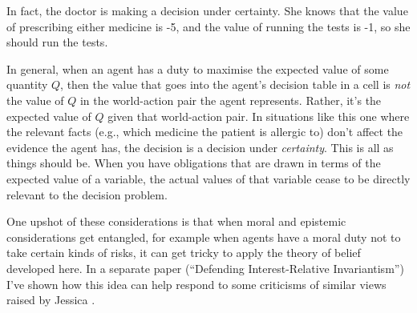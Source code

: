\noindent In fact, the doctor is making a decision under certainty. She knows that the value of prescribing either medicine is -5, and the value of running the tests is -1, so she should run the tests.

In general, when an agent has a duty to maximise the expected value of some quantity \(Q\), then the value that goes into the agent's decision table in a cell is \textit{not} the value of \(Q\) in the world-action pair the agent represents. Rather, it's the expected value of \(Q\) given that world-action pair. In situations like this one where the relevant facts (e.g., which medicine the patient is allergic to) don't affect the evidence the agent has, the decision is a decision under \textit{certainty}. This is all as things should be. When you have obligations that are drawn in terms of the expected value of a variable, the actual values of that variable cease to be directly relevant to the decision problem.

One upshot of these considerations is that when moral and epistemic considerations get entangled, for example when agents have a moral duty not to take certain kinds of risks, it can get tricky to apply the theory of belief developed here. In a separate paper (``Defending Interest-Relative Invariantism'') I've shown how this idea can help respond to some criticisms of similar views raised by Jessica \cite{Brown2008-BROKAP}.